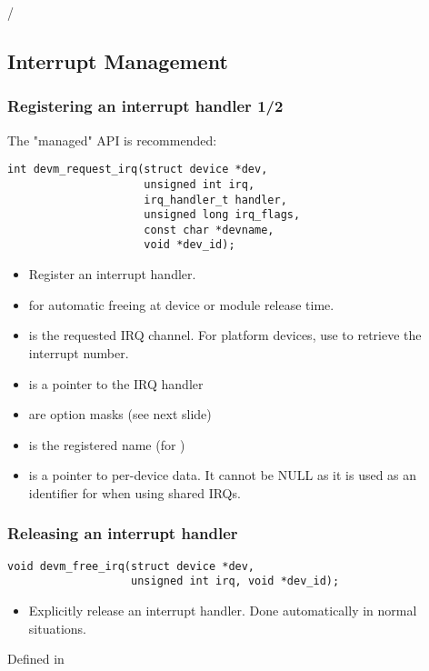 /\subsection{Interrupt Management}

\begin{frame}[fragile]
  \frametitle{Registering an interrupt handler 1/2}
  The "managed" API is recommended:
  \begin{verbatim}
int devm_request_irq(struct device *dev,
                     unsigned int irq,
                     irq_handler_t handler,
                     unsigned long irq_flags,
                     const char *devname,
                     void *dev_id);
  \end{verbatim}
  \begin{itemize}
  \item Register an interrupt handler.
  \item {} for automatic freeing at device or module
        release time.
  \item {} is the requested IRQ channel. For platform
        devices, use  to retrieve the
        interrupt number.
  \item {} is a pointer to the IRQ handler
  \item {} are option masks (see next slide)
  \item {} is the registered name (for
	)
  \item {\small {} is a pointer to per-device data.
        It cannot be NULL as it is used as an identifier for
	 when using shared IRQs.}
  \end{itemize}
\end{frame}

\begin{frame}[fragile]
  \frametitle{Releasing an interrupt handler}
  \begin{verbatim}
void devm_free_irq(struct device *dev,
                   unsigned int irq, void *dev_id);
  \end{verbatim}
  \begin{itemize}
  \item Explicitly release an interrupt handler. Done automatically
        in normal situations.
  \end{itemize}
  Defined in 
\end{frame}

